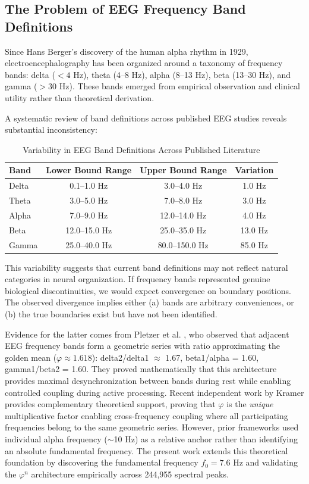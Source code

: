 \documentclass[11pt,a4paper]{article}
\newcommand{\phisym}{\varphi}
\begin{document}
\subsection{The Problem of EEG Frequency Band Definitions}

Since Hans Berger's discovery of the human alpha rhythm in 1929, electroencephalography has been organized around a taxonomy of frequency bands: delta ($<4$ Hz), theta (4--8 Hz), alpha (8--13 Hz), beta (13--30 Hz), and gamma ($>30$ Hz). These bands emerged from empirical observation and clinical utility rather than theoretical derivation.

A systematic review of band definitions across published EEG studies reveals substantial inconsistency:

\begin{table}[H]
\centering
\caption{Variability in EEG Band Definitions Across Published Literature}
\label{tab:band_variability}
\begin{tabular}{@{}lccc@{}}
\toprule
Band & Lower Bound Range & Upper Bound Range & Variation \\
\midrule
Delta & 0.1--1.0 Hz & 3.0--4.0 Hz & 1.0 Hz \\
Theta & 3.0--5.0 Hz & 7.0--8.0 Hz & 3.0 Hz \\
Alpha & 7.0--9.0 Hz & 12.0--14.0 Hz & 4.0 Hz \\
Beta & 12.0--15.0 Hz & 25.0--35.0 Hz & 13.0 Hz \\
Gamma & 25.0--40.0 Hz & 80.0--150.0 Hz & 85.0 Hz \\
\bottomrule
\end{tabular}
\end{table}

This variability suggests that current band definitions may not reflect natural categories in neural organization. If frequency bands represented genuine biological discontinuities, we would expect convergence on boundary positions. The observed divergence implies either (a) bands are arbitrary conveniences, or (b) the true boundaries exist but have not been identified.

Evidence for the latter comes from Pletzer et al. \parencite{pletzer2010golden}, who observed that adjacent EEG frequency bands form a geometric series with ratio approximating the golden mean ($\phisym \approx 1.618$): delta2/delta1 $\approx$ 1.67, beta1/alpha = 1.60, gamma1/beta2 = 1.60. They proved mathematically that this architecture provides maximal desynchronization between bands during rest while enabling controlled coupling during active processing. Recent independent work by Kramer \parencite{kramer2022golden} provides complementary theoretical support, proving that $\phisym$ is the \textit{unique} multiplicative factor enabling cross-frequency coupling where all participating frequencies belong to the same geometric series. However, prior frameworks used individual alpha frequency ($\sim$10 Hz) as a relative anchor rather than identifying an absolute fundamental frequency. The present work extends this theoretical foundation by discovering the fundamental frequency $f_0 = 7.6$ Hz and validating the $\phisym^n$ architecture empirically across 244,955 spectral peaks.
\end{document}
